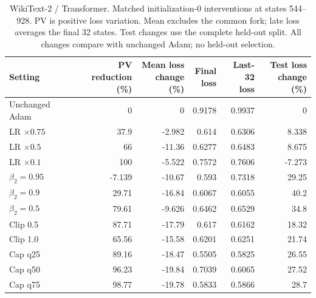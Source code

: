 \begin{table}[H]
\centering
\small
\setlength{\tabcolsep}{4pt}
\begin{tabular}{lrrrrr}
\toprule
Setting & \shortstack{PV reduction\\(\%)} & \shortstack{Mean loss\\change (\%)} & \shortstack{Final\\loss} & \shortstack{Last-32\\loss} & \shortstack{Test loss\\change (\%)} \\
\midrule
Unchanged Adam & 0 & 0 & 0.9178 & 0.9937 & 0 \\
LR $\times0.75$ & 37.9 & -2.982 & 0.614 & 0.6306 & 8.338 \\
LR $\times0.5$ & 66 & -11.36 & 0.6277 & 0.6483 & 8.675 \\
LR $\times0.1$ & 100 & -5.522 & 0.7572 & 0.7606 & -7.273 \\
$\beta_2=0.95$ & -7.139 & -10.67 & 0.593 & 0.7318 & 29.25 \\
$\beta_2=0.9$ & 29.71 & -16.84 & 0.6067 & 0.6055 & 40.2 \\
$\beta_2=0.5$ & 79.61 & -9.626 & 0.6462 & 0.6529 & 34.8 \\
Clip 0.5 & 87.71 & -17.79 & 0.617 & 0.6162 & 18.32 \\
Clip 1.0 & 65.56 & -15.58 & 0.6201 & 0.6251 & 21.74 \\
Cap q25 & 89.16 & -18.47 & 0.5505 & 0.5825 & 26.55 \\
Cap q50 & 96.23 & -19.84 & 0.7039 & 0.6065 & 27.52 \\
Cap q75 & 98.77 & -19.78 & 0.5833 & 0.5866 & 28.7 \\
\bottomrule
\end{tabular}
\caption{WikiText-2 / Transformer. Matched initialization-0 interventions at states 544--928. PV is positive loss variation. Mean excludes the common fork; late loss averages the final 32 states. Test changes use the complete held-out split. All changes compare with unchanged Adam; no held-out selection.}
\end{table}
